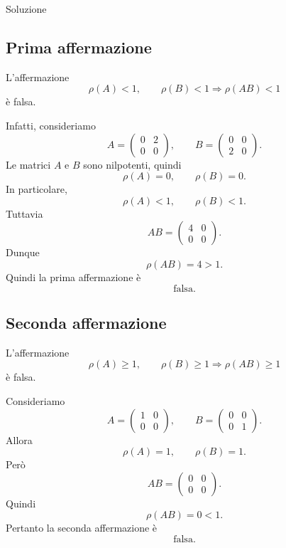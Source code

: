 \documentclass[a4paper]{article}
\begin{document}
\begin{snippetsolution}{Soluzione}
    \subsection*{Prima affermazione}

    L'affermazione
    \[
        \rho(A)<1,\qquad \rho(B)<1
        \Longrightarrow
        \rho(AB)<1
    \]
    è falsa.

    Infatti, consideriamo
    \[
        A=
        \begin{pmatrix}
            0 & 2\\
            0 & 0
        \end{pmatrix},
        \qquad
        B=
        \begin{pmatrix}
            0 & 0\\
            2 & 0
        \end{pmatrix}.
    \]
    Le matrici \(A\) e \(B\) sono nilpotenti, quindi
    \[
        \rho(A)=0,
        \qquad
        \rho(B)=0.
    \]
    In particolare,
    \[
        \rho(A)<1,
        \qquad
        \rho(B)<1.
    \]
    Tuttavia
    \[
        AB=
        \begin{pmatrix}
            4 & 0\\
            0 & 0
        \end{pmatrix}.
    \]
    Dunque
    \[
        \rho(AB)=4>1.
    \]
    Quindi la prima affermazione è
    \[
        \boxed{\text{falsa}.}
    \]

    \subsection*{Seconda affermazione}

    L'affermazione
    \[
        \rho(A)\geq 1,\qquad \rho(B)\geq 1
        \Longrightarrow
        \rho(AB)\geq 1
    \]
    è falsa.

    Consideriamo
    \[
        A=
        \begin{pmatrix}
            1 & 0\\
            0 & 0
        \end{pmatrix},
        \qquad
        B=
        \begin{pmatrix}
            0 & 0\\
            0 & 1
        \end{pmatrix}.
    \]
    Allora
    \[
        \rho(A)=1,
        \qquad
        \rho(B)=1.
    \]
    Però
    \[
        AB=
        \begin{pmatrix}
            0 & 0\\
            0 & 0
        \end{pmatrix}.
    \]
    Quindi
    \[
        \rho(AB)=0<1.
    \]
    Pertanto la seconda affermazione è
    \[
        \boxed{\text{falsa}.}
    \]


\end{snippetsolution}
\end{document}

